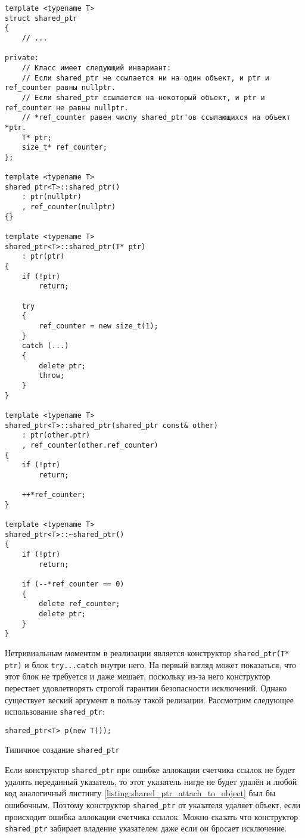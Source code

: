 \begin{verbatim}
template <typename T>
struct shared_ptr
{
    // ...

private:
    // Класс имеет следующий инвариант:
    // Если shared_ptr не ссылается ни на один объект, и ptr и ref_counter равны nullptr.
    // Если shared_ptr ссылается на некоторый объект, и ptr и ref_counter не равны nullptr.
    // *ref_counter равен числу shared_ptr'ов ссылающихся на объект *ptr.
    T* ptr;
    size_t* ref_counter;
};

template <typename T>
shared_ptr<T>::shared_ptr()
    : ptr(nullptr)
    , ref_counter(nullptr)
{}

template <typename T>
shared_ptr<T>::shared_ptr(T* ptr)
    : ptr(ptr)
{
    if (!ptr)
        return;

    try
    {
        ref_counter = new size_t(1);
    }
    catch (...)
    {
        delete ptr;
        throw;
    }
}

template <typename T>
shared_ptr<T>::shared_ptr(shared_ptr const& other)
    : ptr(other.ptr)
    , ref_counter(other.ref_counter)
{
    if (!ptr)
        return;

    ++*ref_counter;
}    

template <typename T>
shared_ptr<T>::~shared_ptr()
{
    if (!ptr)
        return;

    if (--*ref_counter == 0)
    {
        delete ref_counter;
        delete ptr;
    }
}
\end{verbatim}

Нетривиальным моментом в реализации является конструктор \texttt{shared_ptr(T* ptr)} и блок \texttt{try...catch} внутри него. На первый взгляд может показаться, что этот блок не требуется и даже мешает, поскольку из-за него конструктор перестает удовлетворять строгой гарантии безопасности исключений. Однако существует веский аргумент в пользу такой релизации. Рассмотрим следующее использование \texttt{shared_ptr}:

\begin{listing}
\begin{verbatim}
shared_ptr<T> p(new T());
\end{verbatim}
\caption{Типичное создание \texttt{shared_ptr}}
\label{listing:shared_ptr_attach_to_object}
\end{listing}

Если конструктор \texttt{shared_ptr} при ошибке аллокации счетчика ссылок не будет удалять переданный указатель, то этот указатель нигде не будет удалён и любой код аналогичный листингу \ref{listing:shared_ptr_attach_to_object} был бы ошибочным. Поэтому конструктор \texttt{shared_ptr} от указателя удаляет объект, если происходит ошибка аллокации счетчика ссылок. Можно сказать что конструктор \texttt{shared_ptr} забирает владение указателем даже если он бросает исключение.

